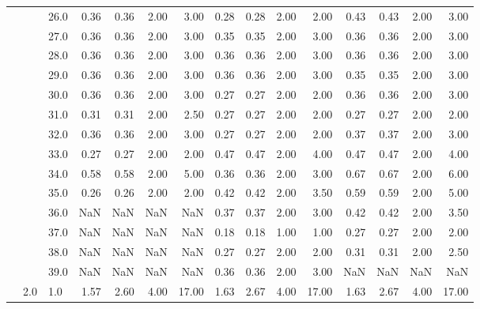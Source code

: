 \begin{tabular}{lllrrrrrrrrrrrr}
      &     & 26.0 &       0.36 &      0.36 & 2.00 &   3.00 &       0.28 &      0.28 & 2.00 &   2.00 &       0.43 &      0.43 & 2.00 &   3.00 \\
      &     & 27.0 &       0.36 &      0.36 & 2.00 &   3.00 &       0.35 &      0.35 & 2.00 &   3.00 &       0.36 &      0.36 & 2.00 &   3.00 \\
      &     & 28.0 &       0.36 &      0.36 & 2.00 &   3.00 &       0.36 &      0.36 & 2.00 &   3.00 &       0.36 &      0.36 & 2.00 &   3.00 \\
      &     & 29.0 &       0.36 &      0.36 & 2.00 &   3.00 &       0.36 &      0.36 & 2.00 &   3.00 &       0.35 &      0.35 & 2.00 &   3.00 \\
      &     & 30.0 &       0.36 &      0.36 & 2.00 &   3.00 &       0.27 &      0.27 & 2.00 &   2.00 &       0.36 &      0.36 & 2.00 &   3.00 \\
      &     & 31.0 &       0.31 &      0.31 & 2.00 &   2.50 &       0.27 &      0.27 & 2.00 &   2.00 &       0.27 &      0.27 & 2.00 &   2.00 \\
      &     & 32.0 &       0.36 &      0.36 & 2.00 &   3.00 &       0.27 &      0.27 & 2.00 &   2.00 &       0.37 &      0.37 & 2.00 &   3.00 \\
      &     & 33.0 &       0.27 &      0.27 & 2.00 &   2.00 &       0.47 &      0.47 & 2.00 &   4.00 &       0.47 &      0.47 & 2.00 &   4.00 \\
      &     & 34.0 &       0.58 &      0.58 & 2.00 &   5.00 &       0.36 &      0.36 & 2.00 &   3.00 &       0.67 &      0.67 & 2.00 &   6.00 \\
      &     & 35.0 &       0.26 &      0.26 & 2.00 &   2.00 &       0.42 &      0.42 & 2.00 &   3.50 &       0.59 &      0.59 & 2.00 &   5.00 \\
      &     & 36.0 &        NaN &       NaN &  NaN &    NaN &       0.37 &      0.37 & 2.00 &   3.00 &       0.42 &      0.42 & 2.00 &   3.50 \\
      &     & 37.0 &        NaN &       NaN &  NaN &    NaN &       0.18 &      0.18 & 1.00 &   1.00 &       0.27 &      0.27 & 2.00 &   2.00 \\
      &     & 38.0 &        NaN &       NaN &  NaN &    NaN &       0.27 &      0.27 & 2.00 &   2.00 &       0.31 &      0.31 & 2.00 &   2.50 \\
      &     & 39.0 &        NaN &       NaN &  NaN &    NaN &       0.36 &      0.36 & 2.00 &   3.00 &        NaN &       NaN &  NaN &    NaN \\
      & 2.0 & 1.0  &       1.57 &      2.60 & 4.00 &  17.00 &       1.63 &      2.67 & 4.00 &  17.00 &       1.63 &      2.67 & 4.00 &  17.00 \\

\end{tabular}
